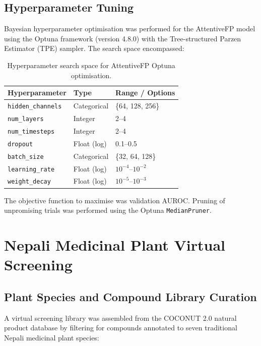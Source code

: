 \subsection{Hyperparameter Tuning}

Bayesian hyperparameter optimisation was performed for the AttentiveFP model using
the Optuna framework (version 4.8.0) with the Tree-structured Parzen Estimator (TPE)
sampler. The search space encompassed:

\begin{table}[H]
\centering
\caption{Hyperparameter search space for AttentiveFP Optuna optimisation.}
\label{tab:search}
\begin{tabular}{lll}
\toprule
\textbf{Hyperparameter} & \textbf{Type} & \textbf{Range / Options} \\
\midrule
\texttt{hidden\_channels}  & Categorical   & \{64, 128, 256\}           \\
\texttt{num\_layers}       & Integer       & 2--4                        \\
\texttt{num\_timesteps}    & Integer       & 2--4                        \\
\texttt{dropout}           & Float (log)   & 0.1--0.5                    \\
\texttt{batch\_size}       & Categorical   & \{32, 64, 128\}             \\
\texttt{learning\_rate}    & Float (log)   & $10^{-4}$--$10^{-2}$        \\
\texttt{weight\_decay}     & Float (log)   & $10^{-5}$--$10^{-3}$        \\
\bottomrule
\end{tabular}
\end{table}

The objective function to maximise was validation AUROC. Pruning of unpromising
trials was performed using the Optuna \texttt{MedianPruner}.

\section{Nepali Medicinal Plant Virtual Screening}

\subsection{Plant Species and Compound Library Curation}

A virtual screening library was assembled from the COCONUT 2.0 natural product
database \parencite{sorokina2021coconut} by filtering for compounds annotated to
seven traditional Nepali medicinal plant species:

